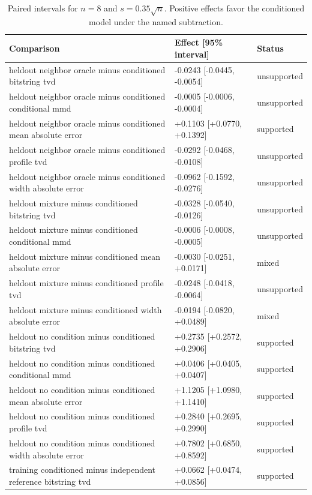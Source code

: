 \clearpage
\begin{table}[p]
\centering
\scriptsize
\setlength{\tabcolsep}{4pt}
\caption{Paired intervals for $n=8$ and $s=0.35\sqrt n$. Positive effects favor the conditioned model under the named subtraction.}
\label{tab:all-intervals-n8-w0.35}
\begin{tabular}{@{}p{}p{}p{}@{}}
\toprule
Comparison & Effect [95\% interval] & Status\\
\midrule
heldout neighbor oracle minus conditioned bitstring tvd & -0.0243 [-0.0445, -0.0054] & unsupported \\
heldout neighbor oracle minus conditioned conditional mmd & -0.0005 [-0.0006, -0.0004] & unsupported \\
heldout neighbor oracle minus conditioned mean absolute error & +0.1103 [+0.0770, +0.1392] & supported \\
heldout neighbor oracle minus conditioned profile tvd & -0.0292 [-0.0468, -0.0108] & unsupported \\
heldout neighbor oracle minus conditioned width absolute error & -0.0962 [-0.1592, -0.0276] & unsupported \\
heldout mixture minus conditioned bitstring tvd & -0.0328 [-0.0540, -0.0126] & unsupported \\
heldout mixture minus conditioned conditional mmd & -0.0006 [-0.0008, -0.0005] & unsupported \\
heldout mixture minus conditioned mean absolute error & -0.0030 [-0.0251, +0.0171] & mixed \\
heldout mixture minus conditioned profile tvd & -0.0248 [-0.0418, -0.0064] & unsupported \\
heldout mixture minus conditioned width absolute error & -0.0194 [-0.0820, +0.0489] & mixed \\
heldout no condition minus conditioned bitstring tvd & +0.2735 [+0.2572, +0.2906] & supported \\
heldout no condition minus conditioned conditional mmd & +0.0406 [+0.0405, +0.0407] & supported \\
heldout no condition minus conditioned mean absolute error & +1.1205 [+1.0980, +1.1410] & supported \\
heldout no condition minus conditioned profile tvd & +0.2840 [+0.2695, +0.2990] & supported \\
heldout no condition minus conditioned width absolute error & +0.7802 [+0.6850, +0.8592] & supported \\
training conditioned minus independent reference bitstring tvd & +0.0662 [+0.0474, +0.0856] & supported \\

\end{tabular}
\end{table}
